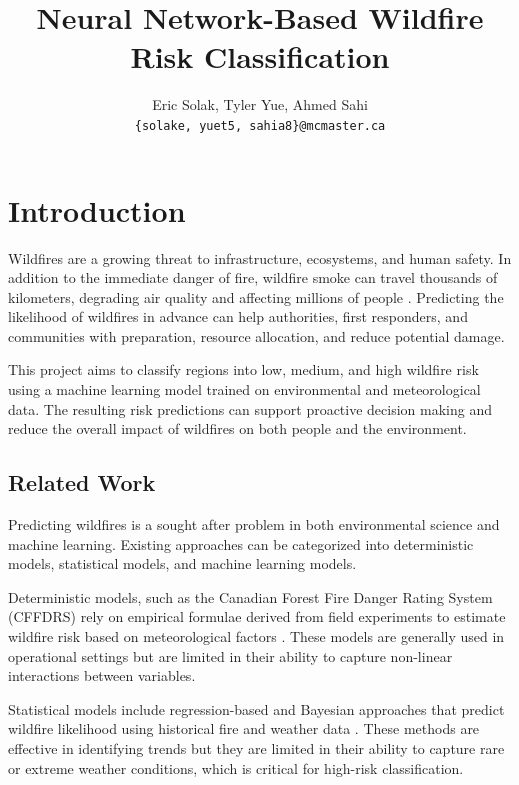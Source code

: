 \documentclass[11pt]{article}
\title{Neural Network-Based Wildfire Risk Classification}
\author{Eric Solak, Tyler Yue, Ahmed Sahi \\
  \texttt{\{solake, yuet5, sahia8\}@mcmaster.ca} }
\begin{document}
\maketitle

\section{Introduction}

Wildfires are a growing threat to infrastructure, ecosystems, and human safety. In addition to the immediate danger of fire, wildfire smoke can travel thousands of kilometers, degrading air quality and affecting
millions of people \citet{NASAwildfires}. Predicting the likelihood of wildfires in advance can help authorities, first responders, and communities with preparation, resource allocation, and reduce potential damage.

This project aims to classify regions into low, medium, and high wildfire risk using a machine learning model trained on environmental and meteorological data. The resulting risk predictions can support proactive
decision making and reduce the overall impact of wildfires on both people and the environment.

\subsection{Related Work}

Predicting wildfires is a sought after problem in both environmental science and machine learning. Existing approaches can be categorized into deterministic models, statistical models, and machine learning models.

Deterministic models, such as the Canadian Forest Fire Danger Rating System (CFFDRS) rely on empirical formulae derived from field experiments to estimate wildfire risk based on meteorological factors \citet{cffdrs}. These models are
generally used in operational settings but are limited in their ability to capture non-linear interactions between variables.

Statistical models include regression-based and Bayesian approaches that predict wildfire likelihood using historical fire and weather data \citet{statisticalregression2024, bayesian2019}. These methods are effective in identifying trends but they are limited in
their ability to capture rare or extreme weather conditions, which is critical for high-risk classification.
\end{document}
